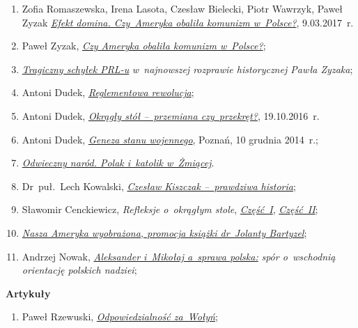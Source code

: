 \documentclass[a4paper,11pt]{article}
\newcommand{\spaceTwo}{1em}
\newcommand{\tb}{\textbf}
\newcommand{\Work}[1]{ \begin{center} {\large \tb{#1}} \end{center} }
\begin{document}
\begin{enumerate}
\item Zofia Romaszewska, Irena Lasota, Czesław Bielecki, Piotr
  Wawrzyk, Paweł Zyzak
  \href{https://www.youtube.com/watch?v=HPcq9KMjkI4\&t=5s}{\emph{Efekt
      domina. Czy~Ameryka obaliła komunizm w~Polsce?}}, 9.03.2017~r.
\item Paweł Zyzak,
  \href{https://www.youtube.com/watch?v=VhOWJeENLk8}{\emph{Czy Ameryka
      obaliła komunizm w~Polsce?}};
\item
  \href{https://www.youtube.com/watch?v=HVrV3Xc9gow\&t=1s}{\emph{Tragiczny
      schyłek PRL-u}} \emph{w~najnowszej rozprawie historycznej Pawła
    Zyzaka};
\item Antoni Dudek, \href{https://www.youtube.com/watch?v=WLyKBTgDSZg}
  {\emph{Reglementowa rewolucja}};
\item Antoni Dudek,
  \href{https://www.youtube.com/watch?v=uPB50xcKnJA}{\emph{Okrągły
      stół --~przemiana czy~przekręt?}}, 19.10.2016~r.
\item Antoni Dudek,
  \href{https://www.youtube.com/watch?v=MTjE-GK9WGM}{\emph{Geneza
      stanu wojennego}}, Poznań, 10 grudnia 2014~r.;
\item \href{https://www.youtube.com/watch?v=WLyKBTgDSZg}
  {\emph{Odwieczny naród. Polak i~katolik w~Żmiącej}}.
\item Dr~puł.~Lech Kowalski,
  \href{https://www.youtube.com/watch?v=mJu0393YY0c} {\emph{Czesław
      Kiszczak --~prawdziwa historia}};
\item Sławomir Cenckiewicz, \emph{Refleksje o~okrągłym stole},
  \href{https://www.youtube.com/watch?v=rmK_DtAZBnM}{\emph{Część~I}},
  \href{https://www.youtube.com/watch?v=-kSeA25NJK8}{\emph{Część~II}};
\item \href{https://www.youtube.com/watch?v=H0pB_66MDz8}{\emph{Nasza
      Ameryka wyobrażona, promocja książki dr~Jolanty Bartyzel}};
\item Andrzej Nowak,
  \href{https://www.youtube.com/watch?v=K10gwYW6JeE}{\emph{Aleksander
      i~Mikołaj a~sprawa polska:}} \emph{spór o~wschodnią orientację
    polskich nadziei};
\end{enumerate}

\vspace{\spaceTwo}



\Work{Artykuły}

\begin{enumerate}
\item Paweł Rzewuski,
  \href{http://www.teologiapolityczna.pl/pawel-rzewuski-odpowiedzialnosc-za-wolyn-tpct-40-}{\emph{Odpowiedzialność
      za~Wołyń}};
\end{enumerate}
\end{document}
